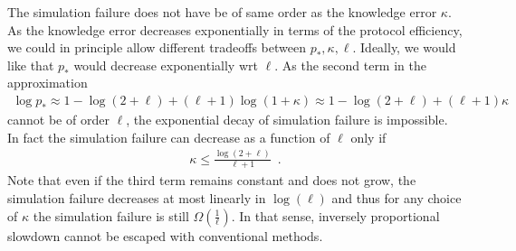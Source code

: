 \documentclass{crypto-exercise}
\begin{document}
\begin{solution}
The simulation failure does not have be of same order as the knowledge error $\kappa$. As the knowledge error decreases exponentially in terms of the protocol efficiency, we could in principle allow different tradeoffs between $p_*, \kappa, \ell$. Ideally, we would like that $p_*$ would decrease exponentially wrt $\ell$. As the second term in the approximation
\begin{align*}
\log p_*\approx 1-\log (2+\ell)+(\ell+1)\log(1+\kappa)\approx 1-\log (2+\ell)+(\ell+1)\kappa 
\end{align*}
cannot be of order $\ell$, the exponential decay of simulation failure is impossible. In fact the simulation failure can decrease as a function of $\ell$ only if 
\begin{align*}
\kappa\leq \frac{\log(2+\ell)}{\ell+1}\enspace.
\end{align*}      
Note that even if the third term remains constant and does not grow, the simulation failure  decreases at most linearly in $\log(\ell)$ and thus for any choice of $\kappa$ the simulation failure is still $\Omega(\frac{1}{\ell})$. In that sense, inversely proportional slowdown cannot be escaped with conventional methods.     
\end{solution}
\end{document}
